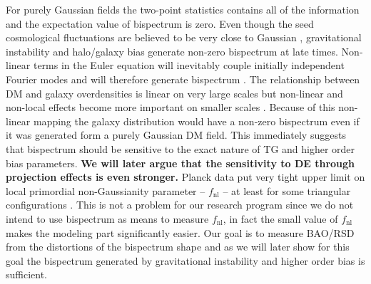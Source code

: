 For purely Gaussian fields the two-point statistics contains all of the
information and the expectation value of bispectrum is zero.  Even though the seed
cosmological fluctuations are believed to be very close to Gaussian
\cite{2009arXiv0907.5424B,2003hep.ph....4257T},
gravitational instability and halo/galaxy bias generate non-zero bispectrum at
late times. Non-linear terms in the Euler equation will inevitably
couple initially independent Fourier modes and will therefore generate
bispectrum \cite{2002PhR...367....1B}. The relationship between DM and galaxy overdensities  is linear
on very large scales but non-linear and non-local effects become more important
on smaller scales \cite{2012PhRvD..86h3540B,2011JCAP...10..031B,2014PhRvD..90l3522S}. Because of this non-linear mapping the galaxy distribution
would have a non-zero bispectrum even if it was generated form a purely
Gaussian DM field. This immediately suggests that bispectrum should be
sensitive to the exact nature of TG and higher order bias parameters.
\textbf{We will later argue that the sensitivity to DE  through projection
effects is even stronger.} Planck data put very tight upper limit on local
primordial non-Gaussianity parameter -- $f_\mathrm{nl}$ -- at least for some
triangular configurations \cite{2016A&A...594A..17P,2014A&A...571A..24P}. This is not a problem for our research
program since we do not intend to use bispectrum as means to measure
$f_\mathrm{nl}$, in fact the small value of $f_\mathrm{nl}$ makes the modeling
part significantly easier. Our goal is to measure BAO/RSD from the distortions
of the bispectrum shape and as we will later show for this goal the bispectrum
generated by gravitational instability and higher order bias is sufficient.

